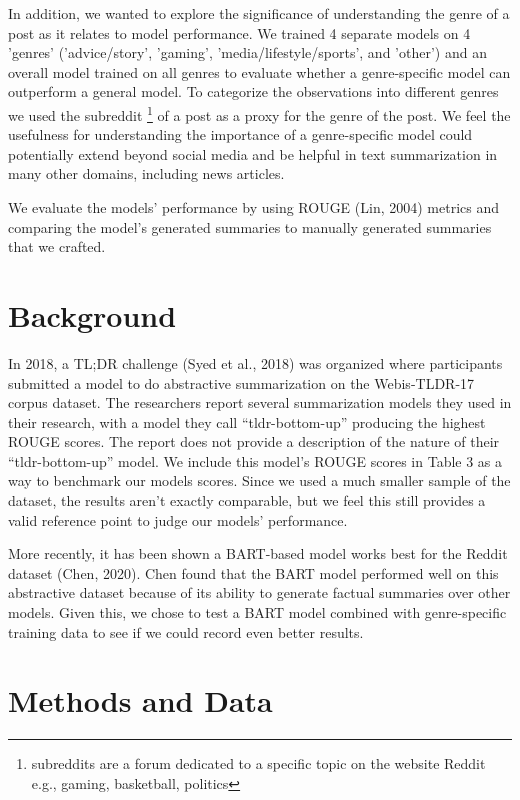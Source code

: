 \documentclass[11pt,a4paper, twocolumn]{article}
\begin{document}
In addition, we wanted to explore the significance of understanding the genre of a post as it relates to model performance. We trained 4 separate models on 4 'genres' ('advice/story', 'gaming', 'media/lifestyle/sports', and 'other') and an overall model trained on all genres to evaluate whether a genre-specific model can outperform a general model. To categorize the observations into different genres we used the subreddit \footnote{subreddits are a forum dedicated to a specific topic on the website Reddit e.g., gaming, basketball, politics} of a post as a proxy for the genre of the post. We feel the usefulness for understanding the importance of a genre-specific model could potentially extend beyond social media and be helpful in text summarization in many other domains, including news articles.

We evaluate the models' performance by using ROUGE (Lin, 2004) metrics and comparing the model's generated summaries to manually generated summaries that we crafted.




\section{Background}
\label{sec:length}

In 2018, a TL;DR challenge (Syed et al., 2018) was organized where participants submitted a model to do abstractive summarization on the Webis-TLDR-17 corpus dataset. The researchers report several summarization models they used in their research, with a model they call “tldr-bottom-up” producing the highest ROUGE scores. The report does not provide a description of the nature of their “tldr-bottom-up” model. We include this model’s ROUGE scores in Table 3 as a way to benchmark our models scores. Since we used a much smaller sample of the dataset, the results aren’t exactly comparable, but we feel this still provides a valid reference point to judge our models’ performance.

More recently, it has been shown a BART-based model works best for the Reddit dataset (Chen, 2020). Chen found that the BART model performed well on this abstractive dataset because of its ability to generate factual summaries over other models. Given this, we chose to test a BART model combined with genre-specific training data to see if we could record even better results.

\section{Methods and Data}
\end{document}
